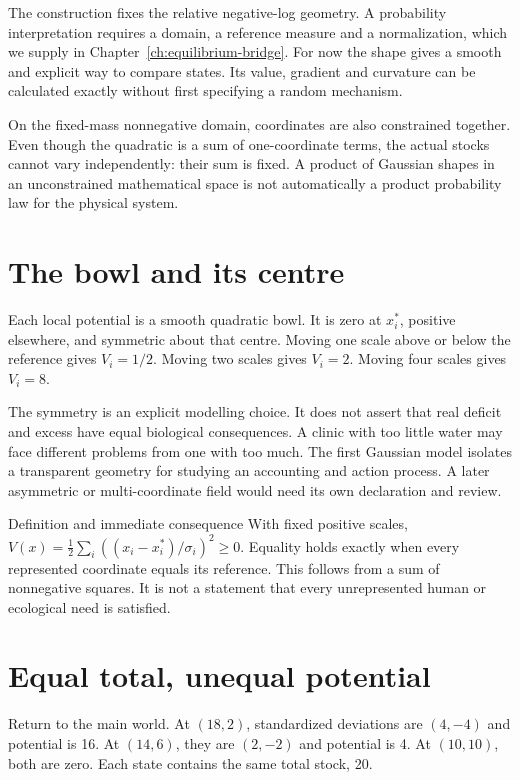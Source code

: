The construction fixes the relative negative-log geometry. A probability interpretation requires a domain, a reference measure and a normalization, which we supply in Chapter~\ref{ch:equilibrium-bridge}. For now the shape gives a smooth and explicit way to compare states. Its value, gradient and curvature can be calculated exactly without first specifying a random mechanism.

On the fixed-mass nonnegative domain, coordinates are also constrained together. Even though the quadratic is a sum of one-coordinate terms, the actual stocks cannot vary independently: their sum is fixed. A product of Gaussian shapes in an unconstrained mathematical space is not automatically a product probability law for the physical system.


\section{The bowl and its centre}
Each local potential is a smooth quadratic bowl. It is zero at \(x_i^*\), positive elsewhere, and symmetric about that centre. Moving one scale above or below the reference gives \(V_i=1/2\). Moving two scales gives \(V_i=2\). Moving four scales gives \(V_i=8\).

The symmetry is an explicit modelling choice. It does not assert that real deficit and excess have equal biological consequences. A clinic with too little water may face different problems from one with too much. The first Gaussian model isolates a transparent geometry for studying an accounting and action process. A later asymmetric or multi-coordinate field would need its own declaration and review.

\begin{lawbox}{Definition and immediate consequence}
With fixed positive scales, \(V(x)=\tfrac12\sum_i((x_i-x_i^*)/\sigma_i)^2\geq0\). Equality holds exactly when every represented coordinate equals its reference. This follows from a sum of nonnegative squares. It is not a statement that every unrepresented human or ecological need is satisfied.
\end{lawbox}

\section{Equal total, unequal potential}
Return to the main world. At \((18,2)\), standardized deviations are \((4,-4)\) and potential is 16. At \((14,6)\), they are \((2,-2)\) and potential is 4. At \((10,10)\), both are zero. Each state contains the same total stock, 20.

